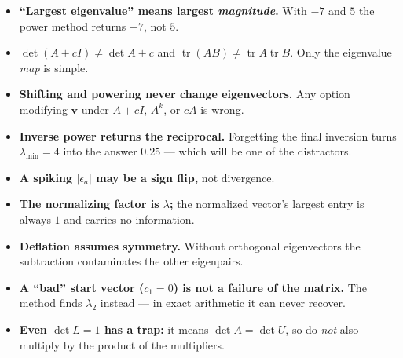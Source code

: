 \begin{trapbox}
\begin{itemize}
\item \textbf{``Largest eigenvalue'' means largest \emph{magnitude}.} With $-7$ and $5$ the power method returns $-7$, not $5$.
\item \textbf{$\det(A+cI) \ne \det A + c$} and $\operatorname{tr}(AB) \ne \operatorname{tr}A\operatorname{tr}B$. Only the eigenvalue \emph{map} is simple.
\item \textbf{Shifting and powering never change eigenvectors.} Any option modifying $\mathbf v$ under $A+cI$, $A^k$, or $cA$ is wrong.
\item \textbf{Inverse power returns the reciprocal.} Forgetting the final inversion turns $\lambda_{\min}=4$ into the answer $0.25$ --- which will be one of the distractors.
\item \textbf{A spiking $|\epsilon_a|$ may be a sign flip,} not divergence.
\item \textbf{The normalizing factor is $\lambda$;} the normalized vector's largest entry is always $1$ and carries no information.
\item \textbf{Deflation assumes symmetry.} Without orthogonal eigenvectors the subtraction contaminates the other eigenpairs.
\item \textbf{A ``bad'' start vector ($c_1=0$) is not a failure of the matrix.} The method finds $\lambda_2$ instead --- in exact arithmetic it can never recover.
\item \textbf{Even $\det L = 1$ has a trap:} it means $\det A = \det U$, so do \emph{not} also multiply by the product of the multipliers.
\end{itemize}
\end{trapbox}
